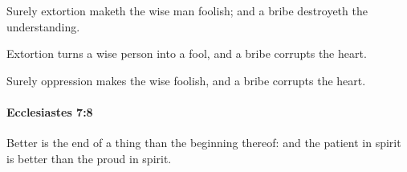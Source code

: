 			\begin{versebox}
					\item[BHS] 
					\item[LXX] 
					\item[ASV] Surely extortion maketh the wise man foolish; and a bribe destroyeth the understanding.
					\item[NIV] Extortion turns a wise person into a fool, and a bribe corrupts the heart.
					\item[NRSV] Surely oppression makes the wise foolish, and a bribe corrupts the heart.
			\end{versebox}

		\paragraph{Ecclesiastes 7:8} %
			\label{ECCLESIASTES-7-8}

			Better is the end of a thing than the beginning thereof: and the patient in spirit is better than the proud in spirit.

